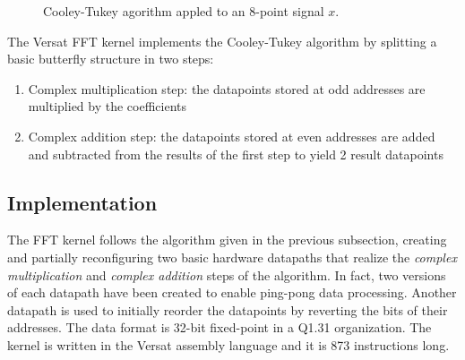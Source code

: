 \begin{figure}[!htb]
	\caption{Cooley-Tukey agorithm appled to an 8-point signal $x$.}
	\label{fig:FFT8pts}
\end{figure}

The Versat FFT kernel implements the Cooley-Tukey algorithm by
splitting a basic butterfly structure in two steps:
\begin{enumerate}
	\item Complex multiplication step: the datapoints stored
          at odd addresses are multiplied by the coefficients
	\item Complex addition step: the datapoints stored at even
          addresses are added and subtracted from the results of the
          first step to yield 2 result datapoints
\end{enumerate}

\subsection{Implementation}
\label{subsection:FFTImplementation}

The FFT kernel follows the algorithm given in the previous subsection,
creating and partially reconfiguring two basic hardware datapaths that
realize the {\em complex multiplication} and {\em complex addition}
steps of the algorithm. In fact, two versions of each datapath have
been created to enable ping-pong data processing. Another datapath is
used to initially reorder the datapoints by reverting the bits of
their addresses. The data format is 32-bit fixed-point in a Q1.31
organization. The kernel is written in the Versat assembly language
and it is 873 instructions long.

